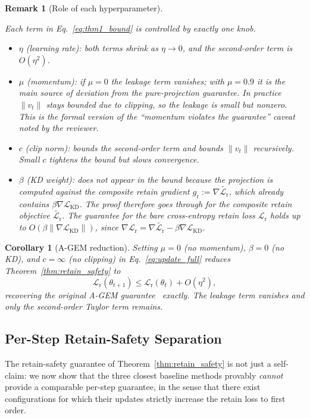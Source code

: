 \documentclass{article}
\newcommand{\gr}{g_{\mathrm{r}}}
\newcommand{\lossr}{\mathcal{L}_{\mathrm{r}}}
\newcommand{\losskd}{\mathcal{L}_{\mathrm{KD}}}
\newtheorem{corollary}{Corollary}
\newtheorem{remark}{Remark}
\newcommand{\new}[1]{{\color{orange}#1}}
\begin{document}
\begin{remark}[Role of each hyperparameter]\label{rem:params}
\new{Each term in Eq.~\ref{eq:thm1_bound} is controlled by exactly one knob.
\begin{itemize}[nosep,leftmargin=*]
\item $\eta$ (learning rate): both terms shrink as $\eta\to 0$, and the second-order term is $O(\eta^2)$.
\item $\mu$ (momentum): if $\mu=0$ the leakage term vanishes; with $\mu=0.9$ it is the main source of deviation from the pure-projection guarantee. In practice $\|v_t\|$ stays bounded due to clipping, so the leakage is small but nonzero. This is the formal version of the ``momentum violates the guarantee'' caveat noted by the reviewer.
\item $c$ (clip norm): bounds the second-order term and bounds $\|v_t\|$ recursively. Small $c$ tightens the bound but slows convergence.
\item $\beta$ (KD weight): does \emph{not} appear in the bound because the projection is computed against the composite retain gradient $\gr := \nabla\widetilde{\lossr}$, which already contains $\beta\nabla\losskd$. The proof therefore goes through for the composite retain objective $\widetilde{\lossr}$. The guarantee for the bare cross-entropy retain loss $\lossr$ holds up to $O(\beta\|\nabla\losskd\|)$, since $\nabla\lossr = \nabla\widetilde{\lossr} - \beta\nabla\losskd$.
\end{itemize}}
\end{remark}

\begin{corollary}[A-GEM reduction]\label{cor:agem_reduction}
\new{Setting $\mu = 0$ (no momentum), $\beta = 0$ (no KD), and $c = \infty$ (no clipping) in Eq.~\ref{eq:update_full} reduces Theorem~\ref{thm:retain_safety} to
\[
\lossr(\theta_{t+1}) \le \lossr(\theta_t) + O(\eta^2),
\]
recovering the original A-GEM guarantee~\cite{chaudhry2019agem} exactly. The leakage term vanishes and only the second-order Taylor term remains.}
\end{corollary}

\subsection{\new{Per-Step Retain-Safety Separation}}\label{sec:separation}

\new{The retain-safety guarantee of Theorem~\ref{thm:retain_safety} is not just a self-claim: we now show that the three closest baseline methods provably \emph{cannot} provide a comparable per-step guarantee, in the sense that there exist configurations for which their updates strictly increase the retain loss to first order.}
\end{document}
